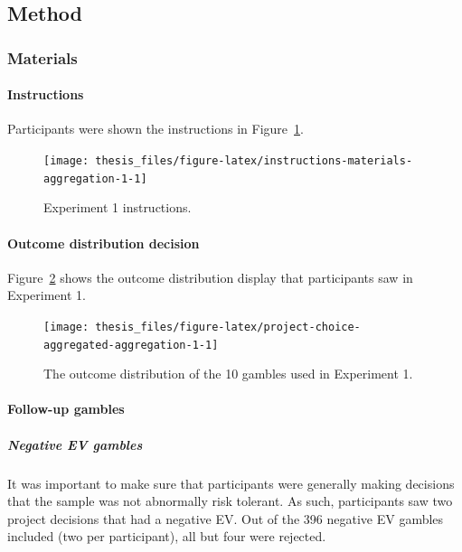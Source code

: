 \documentclass[a4paper, nobind, dvipsnames]{templates/ociamthesis}
\theoremstyle{definition}
\theoremstyle{definition}
\theoremstyle{definition}
\theoremstyle{definition}
\theoremstyle{remark}
\begin{document}
\subsection{Method}

\subsubsection{Materials}

\paragraph{Instructions}

Participants were shown the instructions in
Figure~\ref{fig:instructions-materials-aggregation-1}.



\begin{figure}
\texttt{[image: thesis\_files/figure-latex/instructions-materials-aggregation-1-1]} \caption{Experiment 1 instructions.}\label{fig:instructions-materials-aggregation-1}
\end{figure}

\paragraph{Outcome distribution decision}

Figure~\ref{fig:project-choice-aggregated-aggregation-1} shows the outcome
distribution display that participants saw in Experiment 1.



\begin{figure}
\texttt{[image: thesis\_files/figure-latex/project-choice-aggregated-aggregation-1-1]} \caption{The outcome distribution of the 10 gambles used in Experiment 1.}\label{fig:project-choice-aggregated-aggregation-1}
\end{figure}

\hypertarget{follow-up-materials-aggregation-1-appendix}{%
\paragraph{Follow-up gambles}\label{follow-up-materials-aggregation-1-appendix}}

\subparagraph{Negative EV gambles}

It was important to make sure that participants were generally making decisions
that the sample was not abnormally risk tolerant. As such, participants saw two
project decisions that had a negative EV. Out of the
396 negative EV gambles included (two per
participant), all but four were rejected.
\end{document}
